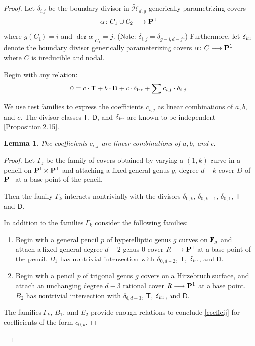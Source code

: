 \documentclass[reqno, 10 pt]{article}
\newtheorem{lem}[thm]{Lemma}
\theoremstyle{definition}
\theoremstyle{remark}
\numberwithin{equation}{section}
\numberwithin{thm}{section}
\numberwithin{prop}{section}
\numberwithin{lem}{section}
\numberwithin{cor}{section}
\numberwithin{conj}{section}
\numberwithin{defn}{section}
\renewcommand{\H}{\mathcal H}
\newcommand{\F}{{\mathbf F}}
\renewcommand{\to}{\longrightarrow}
\newcommand{\sfT}{{\mathsf T}}
\newcommand{\sfD}{{\mathsf D}}
\renewcommand{\P}{{\bf P}}
\renewcommand{\F}{{\bf F}}
\newcommand {\from}{{\colon}}
\renewcommand{\H}{{\mathcal{H}}}
\begin{document}
    \begin{proof}
    Let $\delta_{i,j}$ be the boundary divisor in $\widetilde{\H}_{d,g}$ generically parametrizing covers \[\alpha \from C_{1} \cup C_{2} \to \P^1\] where $g(C_{1}) = i$ and $\deg \alpha|_{C_{1}} = j$. (Note: $\delta_{i, j} = \delta_{g-i, d-j}$.) Furthermore, let $\delta_{\rm irr}$ denote the boundary divisor generically parameterizing covers $\alpha \from C \to \P^{1}$ where $C$ is irreducible and nodal.

    Begin with any relation:
    \begin{equation}\label{rel}
    0 = a\cdot \sfT + b\cdot \sfD  + c \cdot \delta_{\rm irr} + \sum c_{i,j} \cdot \delta_{i,j}
    \end{equation}

    We use test families to express the coefficients $c_{i,j}$ as linear combinations of $a,b$, and $c$.  The divisor classes $\sfT$, $\sfD$, and $\delta_{\rm irr}$ are known to be independent \cite{dp:pic_345}[Proposition 2.15].
    \begin{lem}\label{coeffcij}
    The coefficients $c_{i,j}$ are linear combinations of $a,b$, and $c$. 
    \end{lem}

    \begin{proof} Let $\Gamma_{k}$ be the family of covers obtained by varying a $(1,k)$ curve in a pencil on $\P^1 \times \P^1$ and attaching a fixed general genus $g$, degree $d-k$ cover $D$ of $\P^1$ at a base point of the pencil.  

    Then the family $\Gamma_{k}$ interacts nontrivially with the divisors $\delta_{0,k}$, $\delta_{0,k-1}$, $\delta_{0,1}$, $\sfT$ and $\sfD$.  

    In addition to the families $\Gamma_{k}$ consider the following families:
    \begin{enumerate}[$B_{1}$:]
     \item Begin with a general pencil $p$ of hyperelliptic  genus $g$ curves on $\F_{g}$ and attach a fixed general degree $d-2$ genus $0$ cover $R \to \P^{1}$ at a base point of the pencil.  $B_{1}$ has nontrivial intersection with $\delta_{0,d-2}$, $\sfT$, $\delta_{\rm irr}$, and $\sfD$.  
     \item[$B_{2}$:] Begin with a pencil $p$ of trigonal genus $g$ covers on a Hirzebruch surface, and attach an unchanging degree $d-3$ rational cover $R \to \P^{1}$ at a base point.  $B_{2}$ has nontrivial intersection with $\delta_{0,d-3}$, $\sfT$, $\delta_{\rm irr}$, and $\sfD$.  
    \end{enumerate}
    The families $\Gamma_{k}$, $B_{1}$, and $B_{2}$ provide enough relations to conclude \autoref{coeffcij} for  coefficients of the form $c_{0,k}$.  


\end{proof}
\end{proof}
\end{document}
